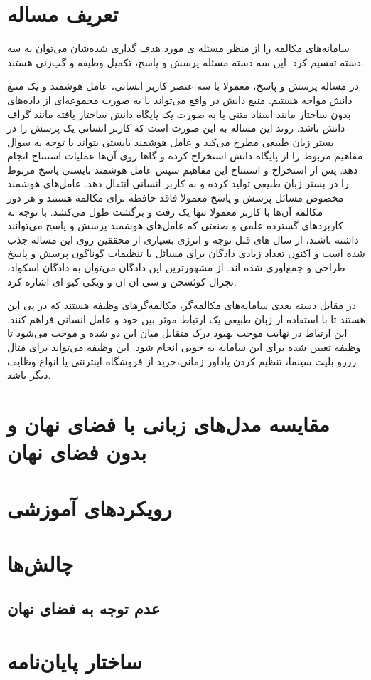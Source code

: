 \section{تعریف مساله} \label{chap1:prob_define}
سامانه‌های مکالمه را از منظر مسئله‌ ی مورد هدف گذاری شده‌شان می‌توان به سه دسته تقسیم کرد. این سه دسته مسئله پرسش و پاسخ، تکمیل وظیفه و گپ‌زنی 
هستند.

در مساله پرسش و پاسخ، معمولا با سه عنصر کاربر انسانی، عامل هوشمند و یک منبع دانش مواجه هستیم. منبع دانش در واقع می‌تواند یا به صورت مجموعه‌ای از داده‌های بدون ساختار مانند اسناد متنی یا به صورت یک پایگاه دانش ساختار یافته مانند گراف دانش باشد. روند این مساله به این صورت است که کاربر انسانی یک پرسش را در بستر زبان طبیعی مطرح می‌کند و عامل هوشمند بایستی بتواند با توجه به سوال مفاهیم مربوط را از پایگاه دانش استخراج کرده و گاها روی آن‌ها عملیات استنتاج انجام دهد. پس از استخراج و استنتاج این مفاهیم سپس عامل هوشمند بایستی پاسخ مربوط را در بستر زبان طبیعی تولید کرده و به کاربر انسانی انتقال دهد.
عامل‌های هوشمند مخصوص مسائل پرسش و پاسخ معمولا فاقد حافظه برای مکالمه هستند و هر دور مکالمه آن‌ها با کاربر معمولا تنها یک رفت و برگشت طول می‌کشد. با توجه به کاربرد‌های گسترده علمی و صنعتی که عامل‌های هوشمند پرسش و پاسخ می‌توانند داشته باشند، از سال های قبل توجه و انرژی بسیاری از محققین روی این مساله جذب شده است و اکنون تعداد زیادی دادگان برای مسائل با تنظیمات گوناگون پرسش و پاسخ طراحی و جمع‌آوری شده اند. از مشهورترین این دادگان می‌توان به دادگان اسکواد، نچرال کوئسچن و سی ان ان  و ویکی کیو ای اشاره کرد.

در مقابل دسته بعدی سامانه‌های مکالمه‌گر،‌ مکالمه‌گر‌های وظیفه هستند که در پی این هستند تا با استفاده از زبان طبیعی یک ارتباط موثر بین خود و عامل انسانی فراهم کنند. این ارتباط در نهایت موجب بهبود درک متقابل میان این دو شده و موجب می‌شود تا وظیفه تعیین شده
برای این سامانه به خوبی انجام شود.
این وظیفه می‌تواند برای مثال رزرو بلیت سینما، تنظیم کردن یاد‌آور زمانی،‌خرید از فروشگاه اینترنتی یا انواع وظایف دیگر باشد.

\section{مقایسه مدل‌های زبانی با فضای نهان و بدون فضای نهان} \label{chap1:latent_or_not}

\section{رویکردهای آموزشی} 
\label{chap1:sec:approaches}


\section{چالش‌ها} \label{chap1:challenge}
\subsection{عدم توجه به فضای نهان} \label{chap1:latent_ignore}

\section{ساختار پایان‌نامه}




